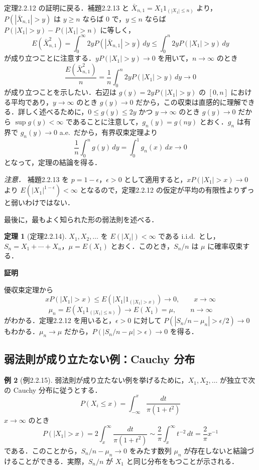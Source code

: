 \documentclass[dvipdfmx]{jsarticle}
\makeatletter
\numberwithin{equation}{section}
\theoremstyle{definition}
\newtheorem{thm}{定理}[section]
\newtheorem{ex}[thm]{例}
\renewenvironment{proof}[1][\proofname]{\par
  \pushQED{\qed}%
  \normalfont \topsep6\p@\@plus6\p@\relax
  \trivlist
  \item\relax
  {\bfseries
  #1\@addpunct{.}}\hspace\labelsep\ignorespaces
}{%
  \popQED\endtrivlist\@endpefalse
}
\renewcommand{\proofname}{証明}
\newcommand{\0}{\bm{0}}
\newcommand{\1}{\bm{1}}
\makeatother
\begin{document}
定理2.2.12 の証明に戻る．補題2.2.13 と $\bar{X}_{n,1} = X_1 1_{(|X_1| \le n)}$ より，$P(|\bar{X}_{n,1}| > y)$ は $y \ge n$ ならば $0$ で，$y \le n$ ならば $P(|X_1| > y) - P(|X_1| > n)$ に等しく，
\[
  E(\bar{X}_{n,1}^2) = \int_0^\infty 2y P(|\bar{X}_{n,1}| > y)\, dy \le \int_0^n 2y P(|X_1| > y)\, dy
\]
が成り立つことに注意する．$yP(|X_1| > y) \to 0$ を用いて，$n \to \infty$ のとき
\[
  \frac{E(\bar{X}_{n,1}^2)}{n} = \frac{1}{n} \int_0^n 2y P(|X_1| > y)\, dy \to 0
\]
が成り立つことを示したい．右辺は $g(y) = 2yP(|X_1| > y)$ の $[0,n]$ における平均であり，$y \to \infty$ のとき $g(y) \to 0$ だから，この収束は直感的に理解できる．詳しく述べるために，$0 \le g(y) \le 2y$ かつ $y \to \infty$ のとき $g(y) \to 0$ だから $\sup g(y) < \infty$ であることに注意して，$g_n(y) = g(ny)$ とおく．$g_n$ は有界で $g_n(y) \to 0$ a.e.\ だから，有界収束定理より
\[
  \frac{1}{n} \int_0^n g(y)\, dy = \int_0^1 g_n(x)\, dx \to 0
\]
となって，定理の結論を得る．

\emph{注意．} 補題2.2.13 を $p = 1 - \epsilon$，$\epsilon > 0$ として適用すると，$xP(|X_1| > x) \to 0$ より $E(|X_1|^{1-\epsilon}) < \infty$ となるので，定理2.2.12 の仮定が平均の有限性よりずっと弱いわけではない．

最後に，最もよく知られた形の弱法則を述べる．

\begin{thm}[定理2.2.14]
$X_1, X_2, \dots$ を $E(|X_i|) < \infty$ である i.i.d.\ とし，$S_n = X_1 + \cdots + X_n$，$\mu = E(X_1)$ とおく．このとき，$S_n/n$ は $\mu$ に確率収束する．
\end{thm}

\begin{proof}
優収束定理から
\[
  xP(|X_1| > x) \le E\!\left(|X_1| 1_{(|X_1|>x)}\right) \to 0, \qquad x \to \infty
\]
\[
  \mu_n = E\!\left(X_1 1_{(|X_1| \le n)}\right) \to E(X_1) = \mu, \qquad n \to \infty
\]
がわかる．定理2.2.12 を用いると，$\epsilon > 0$ に対して $P(|S_n/n - \mu_n| > \epsilon/2) \to 0$ もわかる．$\mu_n \to \mu$ だから，$P(|S_n/n - \mu| > \epsilon) \to 0$ を得る．
\end{proof}

\subsection{弱法則が成り立たない例：Cauchy 分布}

\begin{ex}[例2.2.15]
弱法則が成り立たない例を挙げるために，$X_1, X_2, \dots$ が独立で次の Cauchy 分布に従うとする．
\[
  P(X_i \le x) = \int_{-\infty}^x \frac{dt}{\pi(1+t^2)}
\]
$x \to \infty$ のとき
\[
  P(|X_1| > x) = 2\int_x^\infty \frac{dt}{\pi(1+t^2)} \sim \frac{2}{\pi}\int_x^\infty t^{-2}\, dt = \frac{2}{\pi} x^{-1}
\]
である．このことから，$S_n/n - \mu_n \to 0$ をみたす数列 $\mu_n$ が存在しないと結論づけることができる．実際，$S_n/n$ が $X_1$ と同じ分布をもつことが示される．
\end{ex}
\end{document}
